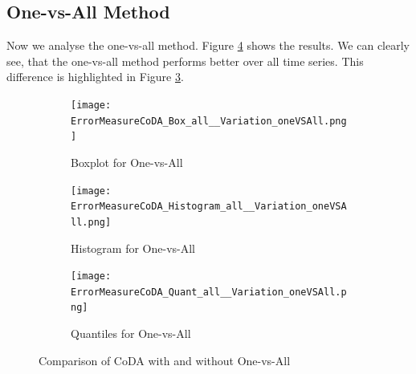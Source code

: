 \subsection{One-vs-All Method}
\label{sec: One-vs-All}

Now we analyse the one-vs-all method. Figure \ref{fig:Coda One-vs-All Comp1} shows the results. We can clearly see, that the one-vs-all method performs better over all time series. This difference is highlighted in Figure \ref{fig:Coda One-vs-All Quant}. 

\begin{figure}[htb!]
\centering
\begin{subfigure}[b]{0.45\textwidth}
\texttt{[image: ErrorMeasureCoDA\_Box\_all\_\_Variation\_oneVSAll.png]}
\caption{Boxplot for One-vs-All}
\label{fig:Coda One-vs-All Box}
\end{subfigure}
\hfill
\begin{subfigure}[b]{0.45\textwidth}
\texttt{[image: ErrorMeasureCoDA\_Histogram\_all\_\_Variation\_oneVSAll.png]}
\caption{Histogram for One-vs-All}
\label{fig:Coda One-vs-All Hist}
\end{subfigure}
\hfill
\begin{subfigure}[b]{0.8\textwidth}
\texttt{[image: ErrorMeasureCoDA\_Quant\_all\_\_Variation\_oneVSAll.png]}
\caption{Quantiles for One-vs-All}
\label{fig:Coda One-vs-All Quant}
\end{subfigure}
\caption{Comparison of CoDA with and without One-vs-All}
\label{fig:Coda One-vs-All Comp1}
\end{figure}

















